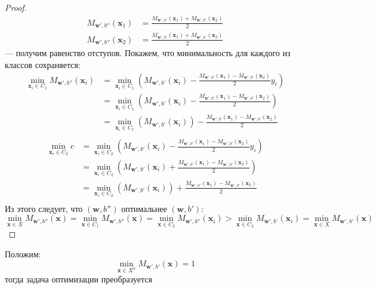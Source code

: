 \documentclass[%
bachelor,    %
subf,        %
href,        %
colorlinks,  %
]{disser}
\let\vec=\mathbf
\begin{document}
\begin{proof}
\begin{equation*}
\begin{aligned}
M_{\vec{w}',b''}(\vec{x}_1)&=\frac{M_{\vec{w}',b'}(\vec{x}_1)+M_{\vec{w}',b'}(\vec{x}_2)}{2} \\
M_{\vec{w}',b''}(\vec{x}_2)&=\frac{M_{\vec{w}',b'}(\vec{x}_1)+M_{\vec{w}',b'}(\vec{x}_2)}{2} 
\end{aligned}
\end{equation*}
--- получим равенство отступов. Покажем, что минимальность для каждого из классов сохраняется:
\begin{equation*}
\begin{aligned}
\min_{\vec{x}_i \in C_1} M_{\vec{w}',b''}(\vec{x}_i) 
&=\min_{\vec{x}_i \in C_1}( M_{\vec{w}',b'}(\vec{x}_i) - \frac{M_{\vec{w}',b'}(\vec{x}_1)-M_{\vec{w}',b'}(\vec{x}_2)}{2}y_i )\\
&=\min_{\vec{x}_i \in C_1}( M_{\vec{w}',b'}(\vec{x}_i) - \frac{M_{\vec{w}',b'}(\vec{x}_1)-M_{\vec{w}',b'}(\vec{x}_2)}{2} )\\
&=\min_{\vec{x}_i \in C_1}( M_{\vec{w}',b'}(\vec{x}_i)) - \frac{M_{\vec{w}',b'}(\vec{x}_1)-M_{\vec{w}',b'}(\vec{x}_2)}{2} \\
\end{aligned}
\end{equation*}
\begin{equation*}
\begin{aligned}
\min_{\vec{x}_i \in C_2} c
&=\min_{\vec{x}_i \in C_2}( M_{\vec{w}',b'}(\vec{x}_i) - \frac{M_{\vec{w}',b'}(\vec{x}_1)-M_{\vec{w}',b'}(\vec{x}_2)}{2}y_i )\\
&=\min_{\vec{x}_i \in C_2}( M_{\vec{w}',b'}(\vec{x}_i) + \frac{M_{\vec{w}',b'}(\vec{x}_1)-M_{\vec{w}',b'}(\vec{x}_2)}{2} )\\
&=\min_{\vec{x}_i \in C_2}( M_{\vec{w}',b'}(\vec{x}_i)) + \frac{M_{\vec{w}',b'}(\vec{x}_1)-M_{\vec{w}',b'}(\vec{x}_2)}{2} \\
\end{aligned}
\end{equation*}
Из этого следует, что $(\vec{w},b'')$ оптимальнее $(\vec{w},b')$:
$$\min_{\vec{x} \in X} M_{\vec{w}',b''}(\vec{x}) = \min_{\vec{x} \in C_1} M_{\vec{w}',b''}(\vec{x}) =\min_{\vec{x} \in C_2} M_{\vec{w}',b''}(\vec{x}_i) > \min_{\vec{x} \in C_2} M_{\vec{w}',b'}(\vec{x}_i) = \min_{\vec{x} \in X} M_{\vec{w}',b'}(\vec{x})$$
\end{proof}
Положим:
$$\min_{\vec{x} \in X^n} M_{\vec{w}',b'}(\vec{x}) = 1 $$
тогда задача оптимизации преобразуется
\end{document}
